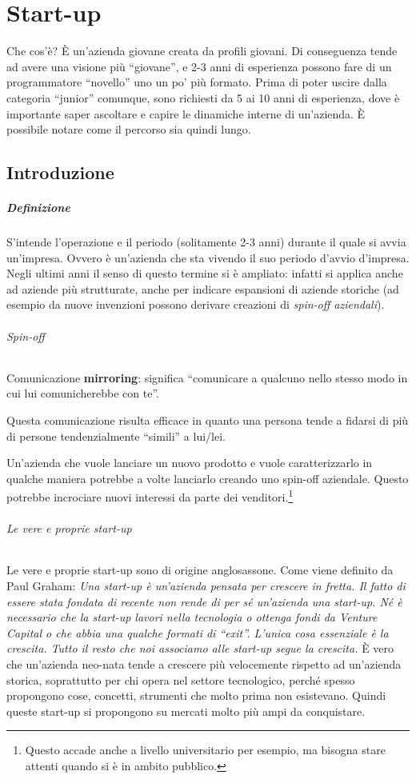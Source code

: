 \chapter{Start-up}

Che cos'è? È un'azienda giovane creata da profili giovani. Di conseguenza tende
ad avere una visione più ``giovane'', e 2-3 anni di esperienza possono fare di
un programmatore ``novello'' uno un po' più formato.
Prima di poter uscire dalla categoria ``junior'' comunque, sono richiesti da 5
ai 10 anni di esperienza, dove è importante saper ascoltare e capire le
dinamiche interne di un'azienda. È possibile notare come il percorso sia
quindi lungo.

\section{Introduzione}

\paragraph*{Definizione} S'intende l'operazione e il periodo (solitamente 2-3
anni) durante il quale si avvia un'impresa. Ovvero è un'azienda che sta vivendo
il suo periodo d'avvio d'impresa. Negli ultimi anni il senso di questo termine
si è ampliato: infatti si applica anche ad aziende più strutturate, anche per
indicare espansioni di aziende storiche (ad esempio da nuove invenzioni possono
derivare creazioni di \textit{spin-off aziendali}).

\subparagraph*{Spin-off} 

Comunicazione \textbf{mirroring}: significa ``comunicare a qualcuno nello
stesso modo in cui lui comunicherebbe con te''.

Questa comunicazione risulta efficace in quanto una persona tende a fidarsi di
più di persone tendenzialmente ``simili'' a lui/lei.

Un'azienda che vuole lanciare un nuovo prodotto e vuole caratterizzarlo in
qualche maniera potrebbe a volte lanciarlo creando uno spin-off aziendale.
Questo potrebbe incrociare nuovi interessi da parte dei
venditori.\footnote{Questo accade anche a livello universitario per esempio, ma
bisogna stare attenti quando si è in ambito pubblico.}

\subparagraph*{Le vere e proprie start-up} Le vere e proprie start-up sono di
origine anglosassone. Come viene definito da Paul Graham:
\emph{
Una start-up è un'azienda pensata per crescere in fretta. Il fatto di essere
stata fondata di recente non rende di per sé un'azienda una start-up. Né è
necessario che la start-up lavori nella tecnologia o ottenga fondi da Venture
Capital o che abbia una qualche formati di ``exit''. L'unica cosa essenziale è
la crescita. Tutto il resto che noi associamo alle start-up segue la crescita.
}
È vero che un'azienda neo-nata tende a crescere più velocemente rispetto ad
un'azienda storica, soprattutto per chi opera nel settore tecnologico, perché
spesso propongono cose, concetti, strumenti che molto prima non esistevano.
Quindi queste start-up si propongono su mercati molto più ampi da conquistare.

